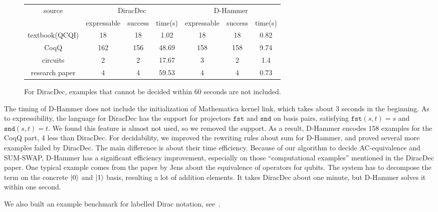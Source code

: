 \begin{figure}
    \center
    \begin{tabular}{c|c c c|c c c}
        \hline
        \multirow{2}{*}{source} & \multicolumn{3}{c|}{DiracDec} & \multicolumn{3}{c}{D-Hammer} \\
        \cline{2-7}
                                 & expressable & success & time(s)           & expressable & success & time(s)                 \\
        \hline
        textbook(QCQI)          & 18          & 18        &    1.02        &    18      & 18          &   0.82      \\
        CoqQ                    & 162          & 156       &    48.69       &   158     &  158   &     9.74     \\
        circuits                 & 2          & 2       &    17.67       &   3     &  2   &     1.4     \\
        research paper                & 4          & 4         &  59.53       &   4    & 4       &  0.73     \\
        \hline
    \end{tabular}        
    \caption{For DiracDec, examples that cannot be decided within 60 seconds are not included.}
\end{figure}

The timing of D-Hammer does not include the initialization of Mathematica kernel link, which takes about 3 seconds in the beginning.
As to expressibility, the language for DiracDec has the support for projectors $\texttt{fst}$ and $\texttt{snd}$ on basis pairs, satisfying $\texttt{fst} (s, t) = s$ and $\texttt{snd} (s, t) = t$. We found this feature is almost not used, so we removed the support. As a result, D-Hammer encodes 158 examples for the CoqQ part, 4 less than DiracDec. For decidability, we improved the rewriting rules about sum for D-Hammer, and proved several more examples failed by DiracDec. 
The main difference is about their time efficiency. Because of our algorithm to decide AC-equivalence and SUM-SWAP, D-Hammer has a significant efficiency improvement, especially on those ``computational examples'' mentioned in the DiracDec paper.
One typical example comes from the paper by Jens about the equivalence of operators for qubits. The system has to decompose the term on the concrete $\ket{0}$ and $\ket{1}$ basis, resulting a lot of addition elements. It takes DiracDec about one minute, but D-Hammer solves it within one second.



We also built an example benchmark for labelled Dirac notation, see~.

